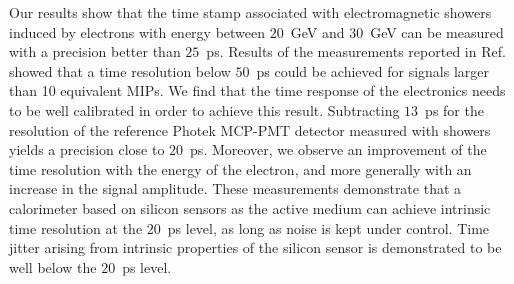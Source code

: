 
Our results show that the time stamp associated with electromagnetic showers
induced by electrons with energy between $20$~GeV and $30$~GeV can be measured
with a precision better than $25$~ps. Results of the  measurements reported
in Ref.~\cite{akchurin} showed that a time resolution below $50$~ps could be
achieved for signals larger than 10 equivalent MIPs. We find that the time
response of the electronics needs to be well calibrated in order to achieve this
result. Subtracting $13$~ps for the resolution of the reference Photek MCP-PMT
detector measured with showers~\cite{Ronzhin2015288} yields a precision close to
$20$~ps. Moreover, we observe an improvement of the time resolution with the
energy of the electron, and more generally with an increase in the signal
amplitude. These measurements demonstrate that a calorimeter based on silicon
sensors as the active medium can achieve intrinsic time resolution at the
$20$~ps level, as long as noise is kept under control. Time jitter arising from
intrinsic properties of the silicon sensor is demonstrated to be well below the
$20$~ps level.

